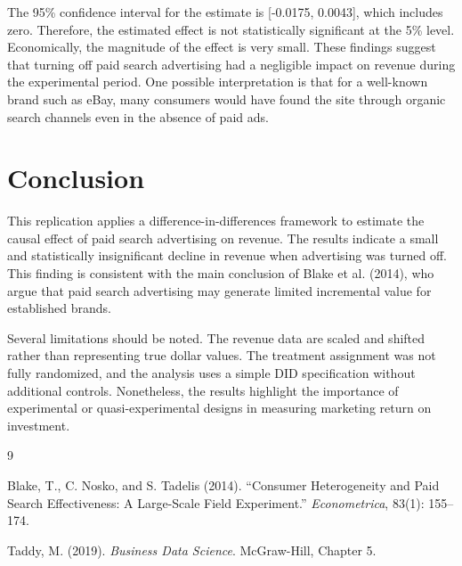 \documentclass[12pt]{article}
\begin{document}
The 95\% confidence interval for the estimate is [-0.0175, 0.0043], which includes zero. Therefore, the estimated effect is not statistically significant at the 5\% level. Economically, the magnitude of the effect is very small. These findings suggest that turning off paid search advertising had a negligible impact on revenue during the experimental period. One possible interpretation is that for a well-known brand such as eBay, many consumers would have found the site through organic search channels even in the absence of paid ads.

\section{Conclusion}

This replication applies a difference-in-differences framework to estimate the causal effect of paid search advertising on revenue. The results indicate a small and statistically insignificant decline in revenue when advertising was turned off. This finding is consistent with the main conclusion of Blake et al. (2014), who argue that paid search advertising may generate limited incremental value for established brands. 

Several limitations should be noted. The revenue data are scaled and shifted rather than representing true dollar values. The treatment assignment was not fully randomized, and the analysis uses a simple DID specification without additional controls. Nonetheless, the results highlight the importance of experimental or quasi-experimental designs in measuring marketing return on investment.

\begin{thebibliography}{9}

Blake, T., C. Nosko, and S. Tadelis (2014).
``Consumer Heterogeneity and Paid Search Effectiveness: A Large-Scale Field Experiment.''
\textit{Econometrica}, 83(1): 155--174.

Taddy, M. (2019).
\textit{Business Data Science}. McGraw-Hill, Chapter 5.

\end{thebibliography}
\end{document}
